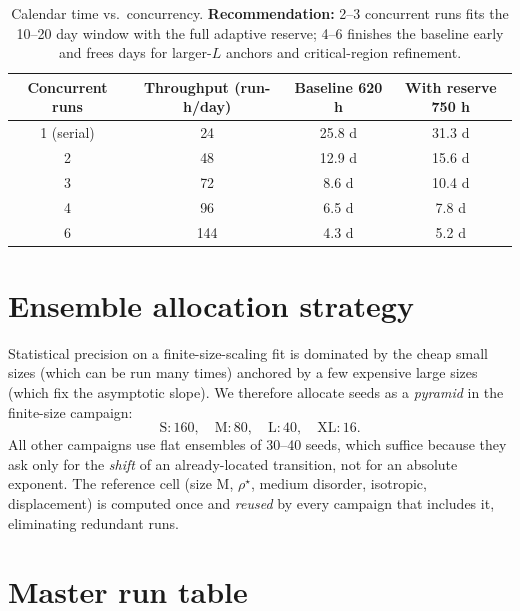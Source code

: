\documentclass[11pt]{article}
\newcommand{\rhostar}{\rho^{\star}}
\begin{document}
\begin{table}[h]
\centering
\small
\renewcommand{\arraystretch}{1.2}
\begin{tabular}{cccc}
\toprule
Concurrent runs & Throughput (run-h/day) & Baseline 620 h & With reserve 750 h \\
\midrule
1 (serial)   & 24  & 25.8 d & 31.3 d \\
2            & 48  & 12.9 d & 15.6 d \\
3            & 72  & 8.6 d  & 10.4 d \\
4            & 96  & 6.5 d  & 7.8 d  \\
6            & 144 & 4.3 d  & 5.2 d  \\
\bottomrule
\end{tabular}
\caption{Calendar time vs.\ concurrency. \textbf{Recommendation:} 2--3 concurrent runs
fits the 10--20 day window with the full adaptive reserve; 4--6 finishes the baseline
early and frees days for larger-$L$ anchors and critical-region refinement.}
\label{tab:calendar}
\end{table}

\section{Ensemble allocation strategy}
\label{sec:ensembles}

Statistical precision on a finite-size-scaling fit is dominated by the cheap small
sizes (which can be run many times) anchored by a few expensive large sizes (which fix
the asymptotic slope). We therefore allocate seeds as a \emph{pyramid} in the
finite-size campaign:
\[
\text{S}:160,\quad \text{M}:80,\quad \text{L}:40,\quad \text{XL}:16 .
\]
All other campaigns use flat ensembles of 30--40 seeds, which suffice because they ask
only for the \emph{shift} of an already-located transition, not for an absolute
exponent. The reference cell (size M, $\rhostar$, medium disorder, isotropic,
displacement) is computed once and \emph{reused} by every campaign that includes it,
eliminating redundant runs.

\section{Master run table}
\label{sec:table}
\end{document}
